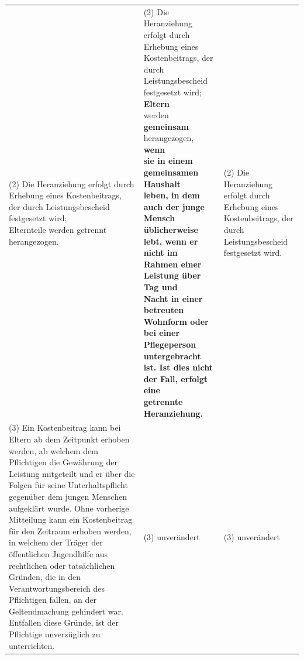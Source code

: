 \documentclass[10pt,a4paper,landscape]{article}
\begin{document}
\begin{longtable}{|L{8.2cm}|L{8.2cm}|L{8.2cm}|}
(2) Die Heranziehung erfolgt durch  \newline Erhebung eines Kostenbeitrags, der durch  \newline Leistungsbescheid festgesetzt \textcolor{diffred}{wird;  \newline Elternteile werden getrennt herangezogen.} & (2) Die Heranziehung erfolgt durch  \newline Erhebung eines Kostenbeitrags, der durch  \newline Leistungsbescheid festgesetzt \textcolor{diffred}{wird; }\textbf{\textcolor{diffred}{Eltern}}\textcolor{diffred}{  \newline werden }\textbf{\textcolor{diffred}{gemeinsam}}\textcolor{diffred}{ herangezogen, }\textbf{\textcolor{diffred}{wenn  \newline sie in einem gemeinsamen Haushalt  \newline leben, in dem auch der junge Mensch  \newline üblicherweise lebt, wenn er nicht im  \newline Rahmen einer Leistung über Tag und  \newline Nacht in einer betreuten Wohnform oder  \newline bei einer Pflegeperson untergebracht  \newline ist. Ist dies nicht der Fall, erfolgt eine  \newline getrennte Heranziehung.}} & (2) Die Heranziehung erfolgt durch  \newline Erhebung eines Kostenbeitrags, der durch  \newline Leistungsbescheid festgesetzt \textcolor{diffgreen}{wird.} \\
\hhline{|---|}
(3) Ein Kostenbeitrag kann bei Eltern ab  \newline dem Zeitpunkt erhoben werden, ab  \newline welchem dem Pflichtigen die Gewährung  \newline der Leistung mitgeteilt und er über die  \newline Folgen für seine Unterhaltspflicht  \newline gegenüber dem jungen Menschen  \newline aufgeklärt wurde. Ohne vorherige  \newline Mitteilung kann ein Kostenbeitrag für den  \newline Zeitraum erhoben werden, in welchem der  \newline Träger der öffentlichen Jugendhilfe aus  \newline rechtlichen oder tatsächlichen Gründen, die  \newline in den Verantwortungsbereich des  \newline Pflichtigen fallen, an der Geltendmachung  \newline gehindert war. Entfallen diese Gründe, ist  \newline der Pflichtige unverzüglich zu unterrichten. & (3) unverändert & (3) unverändert \\

\end{longtable}
\end{document}
